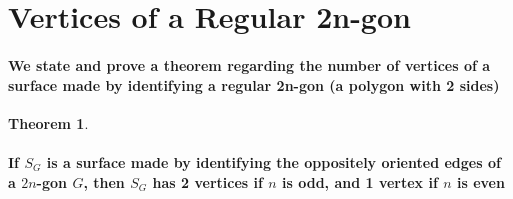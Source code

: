 \documentclass{report}
\newtheorem{theorem}{Theorem}[chapter]
\begin{document}
\section{Vertices of a Regular 2n-gon}

\paragraph{We state and prove a theorem regarding the number of vertices of a surface made by identifying a regular 2n-gon (a polygon with 2 sides)}


\begin{theorem}
{\paragraph{If $S_G$ is a surface made by identifying the oppositely oriented edges of a $2n$-gon $G$, then 
$S_G$ has 2 vertices if $n$ is odd, and 1 vertex if $n$ is even}}
\end{theorem}
\end{document}
